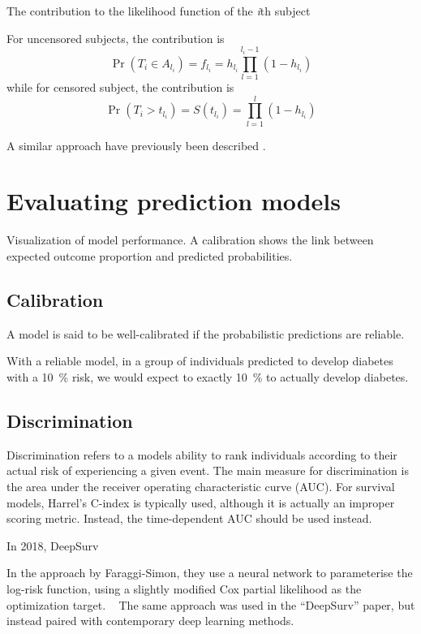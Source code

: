     
The contribution to the likelihood function of the \textit{i}th subject

For uncensored subjects, the contribution is
%
\begin{equation}
    \Pr (T_i \in A_{l_i}) = f_{l_i} = h_{l_i} \prod_{l=1}^{l_i-1}(1-h_{l_i})
\end{equation}
%
while for censored subject, the contribution is
%
\begin{equation}
    \Pr (T_i > t_{l_i}) = S(t_{l_i}) = \prod_{l=1}^{l}(1-h_{l_i})
\end{equation}

A similar approach have previously been described \autocite{biganzoliFeed1998}.




\section{Evaluating prediction models}

Visualization of model performance.
A calibration shows the link between 
expected outcome proportion 
and predicted probabilities.

\subsection{Calibration}

A model is said to be well-calibrated
if the probabilistic predictions are reliable.

With a reliable model, 
in a group of individuals predicted to develop diabetes
with a \SI{10}{\percent} risk, 
we would expect to exactly \SI{10}{\percent} to actually develop diabetes.


\subsection{Discrimination}

Discrimination refers to a models ability to rank individuals according 
to their actual risk of experiencing a given event.
The main measure for discrimination is the area under the receiver
operating characteristic curve (AUC).
For survival models, Harrel's C-index is typically used,
although it is actually an improper scoring metric.
Instead, the time-dependent AUC should be used instead.


In 2018, DeepSurv 

In the approach by Faraggi-Simon, they use a neural network to 
parameterise the log-risk function, using a slightly modified Cox partial 
likelihood as the optimization target.
~\autocite{faraggiNeural1995}
The same approach was used in the \enquote{DeepSurv} paper,
but instead paired with contemporary deep learning methods.
~\autocite{katzmanDeepSurv2018a}







